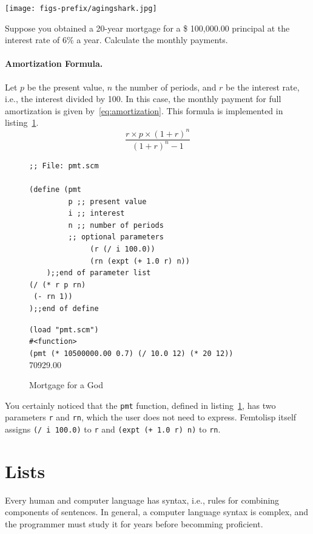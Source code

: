 \documentclass[a4paper,12pt]{book}
\newenvironment{fmpage}[1]
           {\begin{lrbox}{\fmbox}\begin{minipage}{#1}}
           {\end{minipage}\end{lrbox}\fbox{\usebox{\fmbox}}}
\begin{document}
\texttt{[image: figs-prefix/agingshark.jpg]}

Suppose you obtained a 20-year mortgage
for a \$ 100,000.00 principal at the interest
rate of 6\% a year. Calculate the monthly payments.

\paragraph{Amortization Formula.} Let $p$ be the
present value, $n$ the number of periods,
and $r$ be the
interest rate, i.e., the interest divided by 100.
In this case, the monthly payment for full
amortization is given by~\ref{eq:amortization}.
This formula is implemented in
listing~\ref{Pan:mortgage}.
\begin{equation}
\frac{r\times p\times(1+r)^n}{(1+r)^n - 1}
\label{eq:amortization}
\end{equation}

\begin{figure}[!h]
\begin{fmpage}{0.9\textwidth}
\begin{verbatim}
;; File: pmt.scm

(define (pmt 
         p ;; present value
         i ;; interest 
         n ;; number of periods
         ;; optional parameters
              (r (/ i 100.0)) 
              (rn (expt (+ 1.0 r) n)) 
    );;end of parameter list
(/ (* r p rn)
 (- rn 1))
);;end of define

\end{verbatim}
\end{fmpage}

\begin{fmpage}{0.9\textwidth}
\verb|(load "pmt.scm")|\\
\verb|#<function>|\\
\verb|(pmt (* 10500000.00 0.7) (/ 10.0 12) (* 20 12))|\\
70929.00
\end{fmpage}
\caption{Mortgage for a God}
\label{Pan:mortgage}
\end{figure}

You certainly noticed that the
\verb|pmt| function, defined
in listing~\ref{Pan:mortgage},
has two parameters \verb|r| and \verb|rn|,
which the user does not need
to express. Femtolisp itself
assigns \verb|(/ i 100.0)| to \verb|r|
and \verb|(expt (+ 1.0 r) n)| to \verb|rn|.

\section{Lists}
Every human and computer language
has syntax, i.e., rules for combining
components of sentences.
In general, a computer language
syntax is complex, and the programmer
must study it for years before
becomming proficient.
\end{document}
